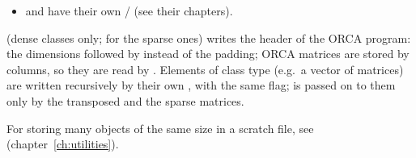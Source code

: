 \begin{description}
\begin{itemize}
	, then triples (row, column, element) and a terminating pair of indices $-1$; : header
	, , triples and the terminating pair. With  rows and columns are swapped.
	\item {} and  have their own / (see their chapters).
	\end{itemize}
	 (dense classes only;  for the sparse ones) writes the header of the ORCA program: the
	dimensions followed by  instead of the padding; ORCA matrices are stored by columns, so they are read by
	. Elements of class type (e.g.\ a vector of matrices) are written recursively by their own
	, with the same  flag;  is passed on to them only by the transposed
	 and the sparse matrices.
\end{description}
For storing many objects of the same size in a scratch file, see  (chapter~\ref{ch:utilities}).


